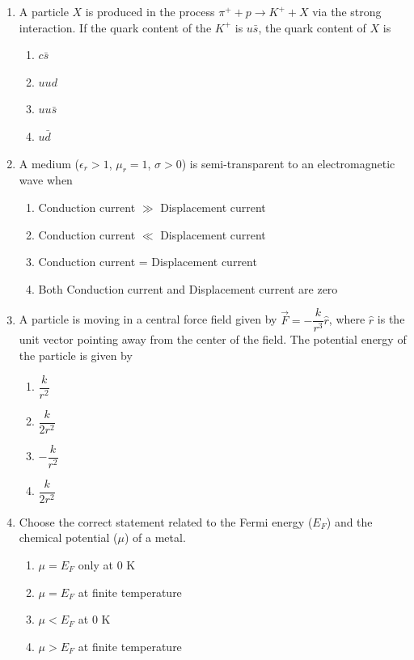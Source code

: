 \documentclass[journal,12pt,onecolumn]{IEEEtran}
\theoremstyle{remark}
\begin{document}
\begin{enumerate}
    \item A particle $X$ is produced in the process $\pi^+ + p \rightarrow K^+ + X$ via the strong interaction. If the quark content of the $K^+$ is $u\bar{s}$, the quark content of $X$ is
   
    \begin{enumerate}
        \item $c\bar{s}$
        \item $uud$
        \item $uu\bar{s}$
        \item $u\bar{d}$
    \end{enumerate}
   

    \item A medium ($\epsilon_r > 1$, $\mu_r = 1$, $\sigma > 0$) is semi-transparent to an electromagnetic wave when
    
    \begin{enumerate}
        \item Conduction current $\gg$ Displacement current
        \item Conduction current $\ll$ Displacement current
        \item Conduction current = Displacement current
        \item Both Conduction current and Displacement current are zero
    \end{enumerate}
   

    \item A particle is moving in a central force field given by $\vec{F} = -\dfrac{k}{r^3}\hat{r}$, where $\hat{r}$ is the unit vector pointing away from the center of the field. The potential energy of the particle is given by
    
    \begin{enumerate}
        \item $\dfrac{k}{r^2}$
        \item $\dfrac{k}{2r^2}$
        \item $-\dfrac{k}{r^2}$
        \item $\dfrac{k}{2r^2}$
    \end{enumerate}
    

    \item Choose the correct statement related to the Fermi energy ($E_F$) and the chemical potential ($\mu$) of a metal.
    
    \begin{enumerate}
        \item $\mu = E_F$ only at $0$ K
        \item $\mu = E_F$ at finite temperature
        \item $\mu < E_F$ at $0$ K
        \item $\mu > E_F$ at finite temperature
    \end{enumerate}
    


\end{enumerate}
\end{document}
